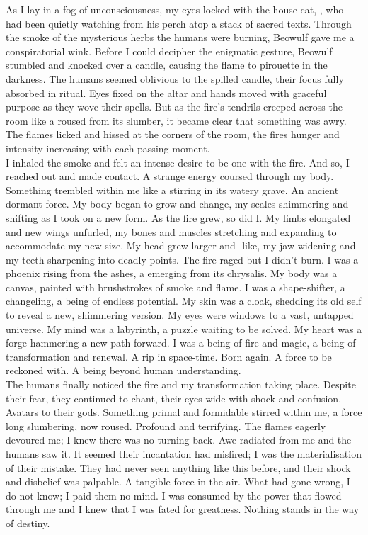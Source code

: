 As I lay in a fog of unconsciousness, my eyes locked with the house cat, , who had been quietly watching from his perch atop a stack of sacred texts. Through the smoke of the mysterious herbs the humans were burning, Beowulf gave me a conspiratorial wink. Before I could decipher the enigmatic gesture, Beowulf stumbled and knocked over a candle, causing the flame to pirouette in the darkness. The humans seemed oblivious to the spilled candle, their focus fully absorbed in ritual. Eyes fixed on the altar and hands moved with graceful purpose as they wove their spells. But as the fire's tendrils creeped across the room like a  roused from its slumber, it became clear that something was awry. The flames licked and hissed at the corners of the room, the fires hunger and intensity increasing with each passing moment. \\

I inhaled the smoke and felt an intense desire to be one with the fire. And so, I reached out and made contact. A strange energy coursed through my body. Something trembled within me like a  stirring in its watery grave. An ancient dormant force. My body began to grow and change, my scales shimmering and shifting as I took on a new form. As the fire grew, so did I. My limbs elongated and new wings unfurled, my bones and muscles stretching and expanding to accommodate my new size. My head grew larger and -like, my jaw widening and my teeth sharpening into deadly points. The fire raged but I didn't burn. I was a phoenix rising from the ashes, a  emerging from its chrysalis. My body was a canvas, painted with brushstrokes of smoke and flame. I was a shape-shifter, a changeling, a being of endless potential. My skin was a cloak, shedding its old self to reveal a new, shimmering version. My eyes were windows to a vast, untapped universe. My mind was a labyrinth, a puzzle waiting to be solved. My heart was a forge hammering a new path forward. I was a being of fire and magic, a being of transformation and renewal. A rip in space-time. Born again. A force to be reckoned with. A being beyond human understanding. \\

The humans finally noticed the fire and my transformation taking place. Despite their fear, they continued to chant, their eyes wide with shock and confusion. Avatars to their gods. Something primal and formidable stirred within me, a force long slumbering, now roused. Profound and terrifying. The flames eagerly devoured me; I knew there was no turning back. Awe radiated from me and the humans saw it. It seemed their incantation had misfired; I was the materialisation of their mistake. They had never seen anything like this before, and their shock and disbelief was palpable. A tangible force in the air. What had gone wrong, I do not know; I paid them no mind. I was consumed by the power that flowed through me and I knew that I was fated for greatness. Nothing stands in the way of destiny. \\

